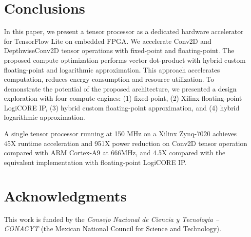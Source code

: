\section{Conclusions}
\label{sec:conclusions}

In this paper, we present a tensor processor as a dedicated hardware accelerator for TensorFlow Lite on embedded FPGA. We accelerate Conv2D and DepthwiseConv2D tensor operations with fixed-point and floating-point. The proposed compute optimization performs vector dot-product with hybrid custom floating-point and logarithmic approximation. This approach accelerates computation, reduces energy consumption and resource utilization. To demonstrate the potential of the proposed architecture, we presented a design exploration with four compute engines: (1) fixed-point, (2) Xilinx floating-point LogiCORE IP, (3) hybrid custom floating-point approximation, and (4) hybrid logarithmic approximation.

A single tensor processor running at 150 MHz on a Xilinx Zynq-7020 achieves 45X runtime acceleration and 951X power reduction on Conv2D tensor operation compared with ARM Cortex-A9 at 666MHz, and 4.5X compared with the equivalent implementation with floating-point LogiCORE IP.

\section * {Acknowledgments}\label{sec:Ack}
This work is funded by the \textit{Consejo Nacional de Ciencia y Tecnologia -- CONACYT} (the Mexican National Council for Science and Technology).
